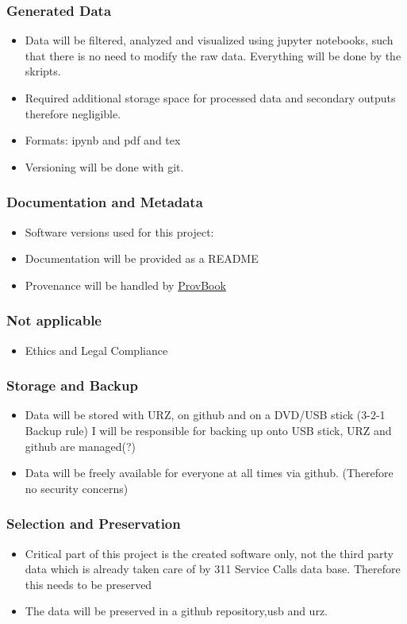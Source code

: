 \documentclass{beamer}
\begin{document}
\begin{frame}
\frametitle{Generated Data}
\begin{itemize}


\item Data will be filtered, analyzed and visualized using jupyter notebooks, such that there is no need to modify the raw data. Everything will be done
by the skripts.
\vfill
\item Required additional storage space for processed data and secondary outputs therefore negligible.
\vfill
\item Formats: ipynb and pdf and tex
\vfill
\item Versioning will be done with git.
\end{itemize}
\end{frame}

\begin{frame}
\frametitle{Documentation and Metadata}
\begin{itemize}
\item Software versions used for this project:
\vfill
\item Documentation will be provided as a README
\vfill
\item Provenance will be handled by \href{https://github.com/Sheeba-Samuel/ProvBook}{ProvBook}
\end{itemize}
\end{frame}
\begin{frame}
\frametitle{Not applicable}
\begin{itemize}
\item Ethics and Legal Compliance
\end{itemize}
\end{frame}
\begin{frame}
\frametitle{Storage and Backup}
\begin{itemize}
\item Data will be stored with URZ, on github and on a DVD/USB stick (3-2-1 Backup rule)
I will be responsible for backing up onto USB stick, URZ and github are managed(?)
\vfill
\item Data will be freely available for everyone at all times via github. (Therefore no security concerns)
\end{itemize}
\end{frame}
\begin{frame}
\frametitle{Selection and Preservation}
\begin{itemize}
\item Critical part of this project is the created software only, not the third party data which is already taken care of by 311 Service Calls data base. Therefore this needs
to be preserved
\vfill
\item The data will be preserved in a github repository,usb and urz.
\end{itemize}
\end{frame}
\end{document}
